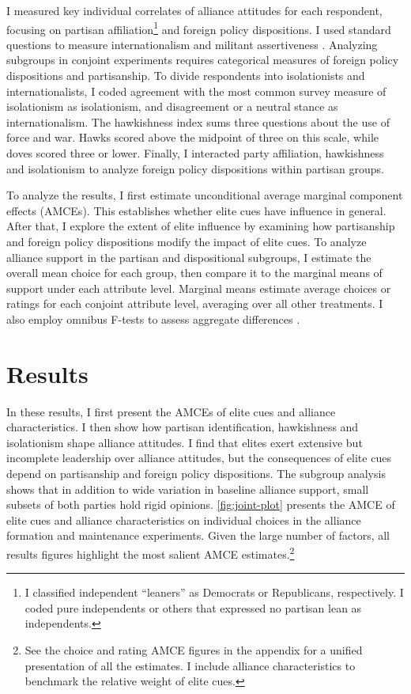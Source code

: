 \documentclass[12pt]{article}
\begin{document}
I measured key individual correlates of alliance attitudes for each respondent, focusing on partisan affiliation\footnote{I classified independent ``leaners'' as Democrats or Republicans, respectively. I coded pure independents or others that expressed no partisan lean as independents.} and foreign policy dispositions. 
I used standard questions to measure internationalism and militant assertiveness \citep{KertzerBrutger2016}.
Analyzing subgroups in conjoint experiments requires categorical measures of foreign policy dispositions and partisanship. 
To divide respondents into isolationists and internationalists, I coded agreement with the most common survey measure of isolationism as isolationism, and disagreement or a neutral stance as internationalism. 
The hawkishness index sums three questions about the use of force and war. 
Hawks scored above the midpoint of three on this scale, while doves scored three or lower. 
Finally, I interacted party affiliation, hawkishness and isolationism to analyze foreign policy dispositions within partisan groups.


To analyze the results, I first estimate unconditional average marginal component effects (AMCEs).
This establishes whether elite cues have influence in general. 
After that, I explore the extent of elite influence by examining how partisanship and foreign policy dispositions modify the impact of elite cues. 
To analyze alliance support in the partisan and dispositional subgroups, I estimate the overall mean choice for each group, then compare it to the marginal means of support under each attribute level.
Marginal means estimate average choices or ratings for each conjoint attribute level, averaging over all other treatments. 
I also employ omnibus F-tests to assess aggregate differences \citep{Leeperetal2020}. 


\section{Results} 


In these results, I first present the AMCEs of elite cues and alliance characteristics.
I then show how partisan identification, hawkishness and isolationism shape alliance attitudes. 
I find that elites exert extensive but incomplete leadership over alliance attitudes, but the consequences of elite cues depend on partisanship and foreign policy dispositions.
The subgroup analysis shows that in addition to wide variation in baseline alliance support, small subsets of both parties hold rigid opinions. 
\autoref{fig:joint-plot} presents the AMCE of elite cues and alliance characteristics on individual choices in the alliance formation and maintenance experiments.
Given the large number of factors, all results figures highlight the most salient AMCE estimates.\footnote{See the choice and rating AMCE figures in the appendix for a unified presentation of all the estimates. I include alliance characteristics to benchmark the relative weight of elite cues.}
\end{document}
